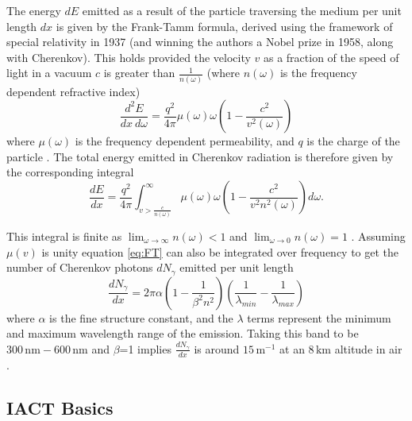 The energy $dE$ emitted as a result of the particle traversing the medium per unit length $dx$ is given by the Frank-Tamm formula, derived using the framework of special relativity in 1937 (and winning the authors a Nobel prize in 1958, along with Cherenkov). This holds provided the velocity $v$ as a fraction of the speed of light in a vacuum $c$ is greater than $\frac{1}{n(\omega)}$ (where $n(\omega)$ is the frequency dependent refractive index)
\begin{equation}
    \frac{d^2E}{dx\ d\omega}=\frac{q^2}{4\pi}\mu(\omega)\omega\left(1- \frac{c^2}{v^2(\omega)} \right)
    \label{eq:FT}
\end{equation}
where $\mu(\omega)$ is the frequency dependent permeability, and $q$ is the charge of the particle \cite{franktamm}. The total energy emitted in Cherenkov radiation is therefore given by the corresponding integral
\begin{equation}
    \frac{dE}{dx}=\frac{q^2}{4\pi}\int_{v>\frac{c}{n(\omega)}}^{\infty}\mu(\omega)\omega \left(1- \frac{c^2}{v^2n^2(\omega)} \right) d \omega .
    \label{eq:FT2}
\end{equation}

This integral is finite as $\lim_{\omega \to \infty} n(\omega)<1$ and $\lim_{\omega \to 0} n(\omega)=1$ . Assuming $\mu(v)$ is unity equation \ref{eq:FT} can also be integrated over frequency \cite{katz} to get the number of Cherenkov photons $dN_{\gamma}$ emitted per unit length
\begin{equation}
    \frac{dN_{\gamma}}{dx}=2\pi\alpha \left( 1- \frac{1}{\beta^2n^2} \right) \left(\frac{1}{\lambda_{min}}-\frac{1}{\lambda_{max}} \right)
\end{equation}
where $\alpha$ is the fine structure constant, and the $\lambda$ terms represent the minimum and maximum wavelength range of the emission. Taking this band to be $\mathrm{300\,nm-600\,nm}$ and $\beta$=1 implies $\frac{dN_{\gamma}}{dx}$ is around $\mathrm{15\,m^{-1}}$ at an $\mathrm{8\,km}$ altitude in air \cite{katz}. 
\subsection{IACT Basics}

